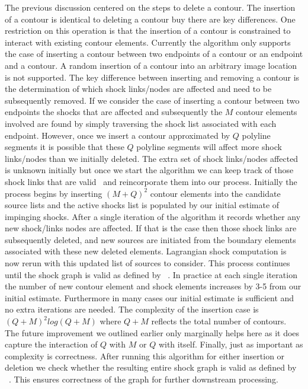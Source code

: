 \begin{appendices}
The previous discussion centered on the steps to delete a contour. The insertion of a contour is identical to deleting a contour buy there are key differences. One restriction on this operation is that the insertion of a contour is constrained to interact with existing contour elements. Currently the algorithm only supports the case of inserting a contour between two endpoints of a contour or an endpoint and a contour. A random insertion of a contour into an arbitrary image location is not supported.  The key difference between inserting and removing a contour is the determination of which shock links/nodes are affected and need to be subsequently removed. If we consider the case of inserting a contour between two endpoints the shocks that are affected and subsequently the $M$ contour elements involved are found by simply traversing the shock list associated with each endpoint. However, once we insert a contour approximated by $Q$ polyline segments it is possible that these $Q$ polyline segments will affect more shock links/nodes than we initially deleted. The extra set of shock links/nodes affected is unknown initially but once we start the algorithm we can keep track of those shock links that are valid~\cite{Tamrakar:Kimia:Shock} and reincorporate them into our process. Initially the process begins by inserting $(M+Q)^2$ contour elements into the candidate source lists and the active shocks list is populated by our initial estimate of impinging shocks. After a single iteration of the algorithm it records whether any new shock/links nodes are affected. If that is the case then those shock links are subsequently deleted, and new sources are initiated from the boundary elements associated with these new deleted elements. Lagrangian shock computation is now rerun with this updated list of sources to consider. This process continues until the shock graph is valid as defined by ~\cite{Tamrakar:Kimia:Shock}. In practice at each single iteration the number of new contour element and shock elements increases by 3-5 from our initial estimate. Furthermore in many cases our initial estimate is sufficient and no extra iterations are needed. The complexity of the insertion case is $(Q+M)^2log(Q+M)$ where $Q+M$ reflects the total number of contours. The future improvement we outlined earlier only marginally helps here as it does capture the interaction of $Q$ with $M$ or $Q$ with itself.  Finally, just as important as complexity is correctness. After running this algorithm for either insertion or deletion we check whether the resulting entire shock graph is valid as defined by ~\cite{Tamrakar:Kimia:Shock}. This ensures correctness of the graph for further downstream processing. 


\end{appendices}
